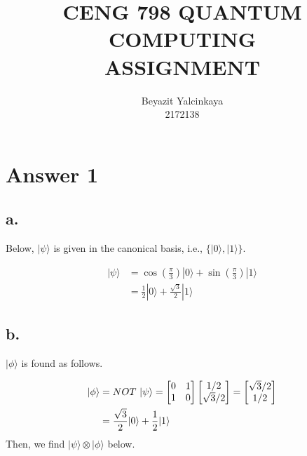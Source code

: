 \documentclass[12pt]{article}
\author{Beyazit Yalcinkaya\\2172138}
\title{\textbf{CENG 798 QUANTUM COMPUTING\\ASSIGNMENT}}
\date{}
\begin{document}
\maketitle



\section*{Answer 1}

\subsection*{a.} 

Below, $|\psi\rangle$ is given in the canonical basis, i.e., $\{|0\rangle, |1\rangle\}$.

\begin{equation}
\begin{split}
|\psi\rangle & = \cos\left(\frac{\pi}{3}\right)|0\rangle + \sin\left(\frac{\pi}{3}\right)|1\rangle\\
& = \frac{1}{2}|0\rangle + \frac{\sqrt{3}}{2}|1\rangle
\end{split}
\end{equation}

\subsection*{b.}

$|\phi\rangle$ is found as follows.

\begin{equation}
\begin{split}
|\phi\rangle & = NOT \ |\psi\rangle = \begin{bmatrix}$$0$$ & $$1$$\\$$1$$ & $$0$$\end{bmatrix}\begin{bmatrix}$$1/2$$\\$$\sqrt{3}/2$$\end{bmatrix} = \begin{bmatrix}$$\sqrt{3}/2$$\\$$1/2$$\end{bmatrix}\\
& = \frac{\sqrt{3}}{2}|0\rangle + \frac{1}{2}|1\rangle
\end{split}
\end{equation}
Then, we find $|\psi\rangle \otimes |\phi\rangle$ below.
\end{document}
